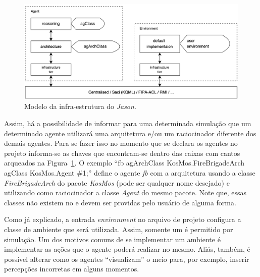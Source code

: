 \begin{figure}
               \begin{center}
               \includegraphics[width=140mm]{figuras/infra.png} 
                \end{center}
                \caption{Modelo da infra-estrutura do \emph{Jason}.}
                \label{fig-jason-infra-1}
\end{figure}

Assim, há a possibilidade de informar para uma determinada simulação que um
determinado agente utilizará uma arquitetura e/ou um raciocinador diferente
dos demais agentes. Para se fazer isso no momento que se declara os agentes
no projeto informa-se as chaves que encontram-se dentro das caixas com
cantos arqueados na Figura~\ref{fig-jason-infra-1}. O exemplo
``fb agArchClass KosMos.FireBrigadeArch agClass KosMos.Agent \#1;'' define
o agente \emph{fb} com a arquitetura usando a classe \emph{FireBrigadeArch}
do pacote \emph{KosMos} (pode ser qualquer nome desejado) e utilizando como
raciocinador a classe \emph{Agent} do mesmo pacote. Note que, essas classes
não existem no \jason e devem ser providas pelo usuário de alguma forma.

Como já explicado, a entrada \emph{environment} no arquivo de projeto
configura a classe de ambiente que será utilizada. Assim, somente um
é permitido por simulação. Um dos motivos comuns de se implementar um
ambiente é implementar as ações que o agente poderá realizar no mesmo. Aliás,
também, é possível alterar como os agentes ``visualizam'' o meio para, por
exemplo, inserir percepções incorretas em alguns momentos.
%

